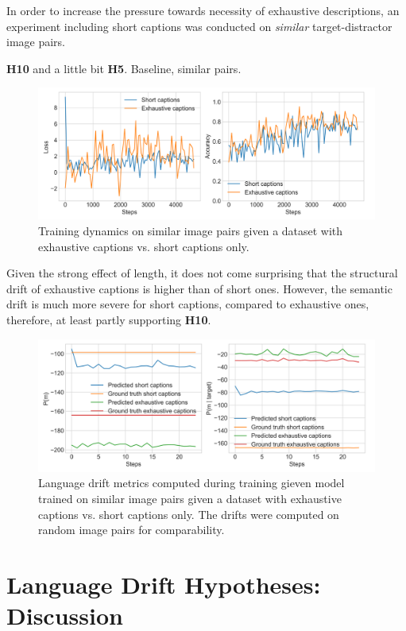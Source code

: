 In order to increase the pressure towards necessity of exhaustive descriptions, an experiment including short captions was conducted on \emph{similar} target-distractor image pairs.

\textbf{H10} and a little bit \textbf{H5}.
Baseline, similar pairs.
\begin{figure}
	\centering
	\includegraphics[width=\linewidth]{images/shapes_short_vs_exh_refgame_49_pure_075_similar.png}
	\caption{Training dynamics on similar image pairs given a dataset with exhaustive captions vs. short captions only.}
	\label{fig:3dshapes_short_v_exh_similar_losses}
\end{figure}

Given the strong effect of length, it does not come surprising that the structural drift of exhaustive captions is higher than of short ones. However, the semantic drift is much more severe for short captions, compared to exhaustive ones, therefore, at least partly supporting \textbf{H10}. 

\begin{figure}
	\centering
	\includegraphics[width=\linewidth]{images/3dshapes_short_vs_exh_structural_semantic_drift_49_pure_075_similar.png}
	\caption{Language drift metrics computed during training gieven model trained on similar image pairs given a dataset with exhaustive captions vs. short captions only. The drifts were computed on random image pairs for comparability.}
	\label{fig:3dshapes_short_v_exh_similar_str_sem}
\end{figure}


\section{Language Drift Hypotheses: Discussion}
